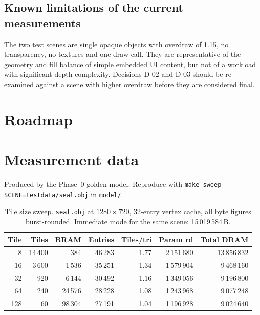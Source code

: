 \documentclass[11pt,a4paper]{article}
\begin{document}
\subsection{Known limitations of the current measurements}

The two test scenes are single opaque objects with overdraw of 1.15, no
transparency, no textures and one draw call. They are representative of the
geometry and fill balance of simple embedded UI content, but not of a workload
with significant depth complexity. Decisions D-02 and D-03 should be re-examined
against a scene with higher overdraw before they are considered final.

\section{Roadmap}
\label{sec:roadmap}


\appendix
\section{Measurement data}
\label{app:data}

Produced by the Phase~0 golden model. Reproduce with
\texttt{make sweep SCENE=testdata/seal.obj} in \texttt{model/}.

\begin{table}[ht]
\centering
\small
\begin{tabular}{@{}rrrrrrr@{}}
\toprule
\textbf{Tile} & \textbf{Tiles} & \textbf{BRAM} & \textbf{Entries} &
\textbf{Tiles/tri} & \textbf{Param rd} & \textbf{Total DRAM} \\
\midrule
8   & 14\,400 & 384     & 46\,283 & 1.77 & 2\,151\,680 & 13\,856\,832 \\
16  & 3\,600  & 1\,536  & 35\,251 & 1.34 & 1\,579\,904 & 9\,468\,160 \\
32  & 920     & 6\,144  & 30\,492 & 1.16 & 1\,349\,056 & 9\,196\,800 \\
64  & 240     & 24\,576 & 28\,228 & 1.08 & 1\,243\,968 & 9\,077\,248 \\
128 & 60      & 98\,304 & 27\,191 & 1.04 & 1\,196\,928 & 9\,024\,640 \\
\bottomrule
\end{tabular}
\caption{Tile size sweep. \texttt{seal.obj} at $1280\times720$, 32-entry vertex
cache, all byte figures burst-rounded. Immediate mode for the same scene:
15\,019\,584\,B.}
\label{tab:tile-sweep}
\end{table}
\end{document}
